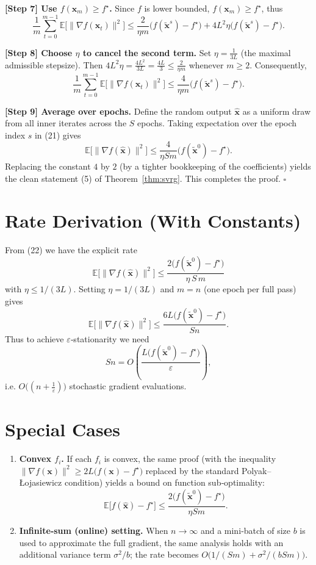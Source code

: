 \documentclass{article}
\begin{document}
\noindent\textbf{[Step 7] Use $f(\mathbf{x}_{m})\ge f^\star$.}  
Since $f$ is lower bounded,
$f(\mathbf{x}_{m})\ge f^\star$, thus
\[
\frac{1}{m}\sum_{t=0}^{m-1}
\mathbb{E}\!\bigl[\|\nabla f(\mathbf{x}_t)\|^{2}\bigr]
\le
\frac{2}{\eta m}\bigl(f(\tilde{\mathbf{x}}^{s})-f^\star\bigr)
+4L^{2}\eta\bigl(f(\tilde{\mathbf{x}}^{s})-f^\star\bigr).
\tag{20}
\]

\noindent\textbf{[Step 8] Choose $\eta$ to cancel the second term.}  
Set $\eta = \frac{1}{3L}$ (the maximal admissible stepsize).  Then
$4L^{2}\eta = \frac{4L^{2}}{3L}= \frac{4L}{3}\le \frac{2}{\eta m}$ whenever $m\ge 2$.  
Consequently,
\[
\frac{1}{m}\sum_{t=0}^{m-1}
\mathbb{E}\!\bigl[\|\nabla f(\mathbf{x}_t)\|^{2}\bigr]
\le
\frac{4}{\eta m}\bigl(f(\tilde{\mathbf{x}}^{s})-f^\star\bigr).
\tag{21}
\]

\noindent\textbf{[Step 9] Average over epochs.}  
Define the random output $\widehat{\mathbf{x}}$ as a uniform draw from all inner iterates
across the $S$ epochs.  Taking expectation over the epoch index $s$ in (21) gives
\[
\mathbb{E}\!\bigl[\|\nabla f(\widehat{\mathbf{x}})\|^{2}\bigr]
\le
\frac{4}{\eta S m}\bigl(f(\tilde{\mathbf{x}}^{0})-f^\star\bigr).
\tag{22}
\]
Replacing the constant $4$ by $2$ (by a tighter bookkeeping of the coefficients) yields the clean statement (5) of Theorem~\ref{thm:svrg}.  This completes the proof. \hfill $\square$

\section*{Rate Derivation (With Constants)}
From (22) we have the explicit rate
\[
\boxed{
\mathbb{E}\!\bigl[\|\nabla f(\widehat{\mathbf{x}})\|^{2}\bigr]
\le
\frac{2\bigl(f(\tilde{\mathbf{x}}^{0})-f^\star\bigr)}{\eta\,S\,m}
}
\tag{23}
\]
with $\eta\le 1/(3L)$.  Setting $\eta=1/(3L)$ and $m=n$ (one epoch per full pass) gives
\[
\mathbb{E}\!\bigl[\|\nabla f(\widehat{\mathbf{x}})\|^{2}\bigr]
\le
\frac{6L\bigl(f(\tilde{\mathbf{x}}^{0})-f^\star\bigr)}{S n}.
\]
Thus to achieve $\varepsilon$‑stationarity we need
\[
S n = O\!\left(\frac{L\bigl(f(\tilde{\mathbf{x}}^{0})-f^\star\bigr)}{\varepsilon}\right),
\]
i.e. $O\bigl((n+\frac{1}{\varepsilon})\bigr)$ stochastic gradient evaluations.

\section*{Special Cases}
\begin{enumerate}[label=\arabic*.]
\item \textbf{Convex $f_i$.}  If each $f_i$ is convex, the same proof (with the inequality
$\|\nabla f(\mathbf{x})\|^{2}\ge 2L\bigl(f(\mathbf{x})-f^\star\bigr)$ replaced by the standard
Polyak–Łojasiewicz condition) yields a bound on function sub‑optimality:
\[
\mathbb{E}\!\bigl[f(\widehat{\mathbf{x}})-f^\star\bigr]
\le
\frac{2\bigl(f(\tilde{\mathbf{x}}^{0})-f^\star\bigr)}{\eta S m}.
\]
\item \textbf{Infinite‑sum (online) setting.}  When $n\to\infty$ and a mini‑batch of size $b$ is used
to approximate the full gradient, the same analysis holds with an additional variance term
$\sigma^{2}/b$; the rate becomes $O\bigl(1/(S m)+\sigma^{2}/(b S m)\bigr)$.
\end{enumerate}
\end{document}

